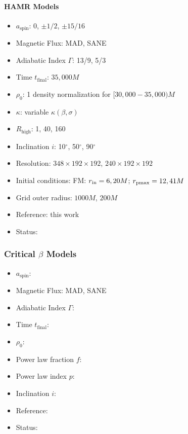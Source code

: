 \paragraph{HAMR Models}

\begin{itemize}[noitemsep]
\item $a_\mathrm{spin}$: 0, $\pm1/2$, $\pm15/16$
\item Magnetic Flux: MAD, SANE
\item Adiabatic Index $\Gamma$: 13/9, 5/3
\item Time $t_\mathrm{final}$: $35,000M$
\item $\rho_0$: 1 density normalization for $[30,000-35,000)M$
\item $\kappa$: variable $\kappa (\beta, \sigma)$
\item $R_\mathrm{high}$: 1, 40, 160
\item Inclination $i$: 10$^\circ$, 50$^\circ$, 90$^\circ$
\item Resolution: $348\times 192\times 192$, $240\times 192\times 192$
\item Initial conditions: FM: $r_{\rm in}=6, 20M$; $r_{\rm pmax}=12, 41M$
\item Grid outer radius: $1000M$, $200M$
\item Reference: this work
\item Status:
\end{itemize}

\subsubsection{Critical $\beta$ Models}

\begin{itemize}[noitemsep]
\item $a_\mathrm{spin}$:
\item Magnetic Flux: MAD, SANE
\item Adiabatic Index $\Gamma$:
\item Time $t_\mathrm{final}$:
\item $\rho_0$:
\item Power law fraction $f$:
\item Power law index $p$:
\item Inclination $i$:
\item Reference:
\item Status:
\end{itemize}

